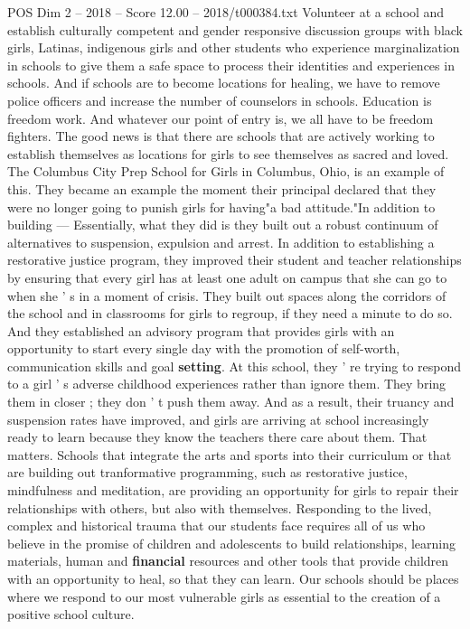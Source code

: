 \begin{textsample}{POS Dim 2 – 2018 – Score 12.00 – 2018/t000384.txt}
Volunteer at a school and establish culturally competent and gender responsive discussion groups with black girls, Latinas, indigenous girls and other students who experience marginalization in schools to give them a safe space to process their identities and experiences in schools.
And if schools are to become locations for healing, we have to remove police officers and increase the number of counselors in schools.
Education is freedom work.
And whatever our point of entry is, we all have to be freedom fighters.
The good news is that there are schools that are actively working to establish themselves as locations for girls to see themselves as sacred and loved.
The Columbus City Prep School for Girls in Columbus, Ohio, is an example of this.
They became an example the moment their principal declared that they were no longer going to punish girls for having"a bad attitude."In addition to building — Essentially, what they did is they built out a robust continuum of alternatives to suspension, expulsion and arrest.
In addition to establishing a restorative justice program, they improved their student and teacher relationships by ensuring that every girl has at least one adult on campus that she can go to when she ' s in a moment of crisis.
They built out spaces along the corridors of the school and in classrooms for girls to regroup, if they need a minute to do so.
And they established an advisory program that provides girls with an opportunity to start every single day with the promotion of self-worth, communication skills and goal \textbf{setting}.
At this school, they ' re trying to respond to a girl ' s adverse childhood experiences rather than ignore them.
They bring them in closer ; they don ' t push them away.
And as a result, their truancy and suspension rates have improved, and girls are arriving at school increasingly ready to learn because they know the teachers there care about them.
That matters.
Schools that integrate the arts and sports into their curriculum or that are building out tranformative programming, such as restorative justice, mindfulness and meditation, are providing an opportunity for girls to repair their relationships with others, but also with themselves.
Responding to the lived, complex and historical trauma that our students face requires all of us who believe in the promise of children and adolescents to build relationships, learning materials, human and \textbf{financial} resources and other tools that provide children with an opportunity to heal, so that they can learn.
Our schools should be places where we respond to our most vulnerable girls as essential to the creation of a positive school culture.

\end{textsample}
